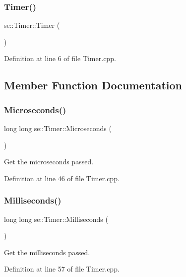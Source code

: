 \subsubsection{\texorpdfstring{Timer()}{Timer()}}
{\footnotesize\ttfamily se\+::\+Timer\+::\+Timer (\begin{DoxyParamCaption}{ }\end{DoxyParamCaption})}



Definition at line 6 of file Timer.\+cpp.



\subsection{Member Function Documentation}
\mbox{\label{classse_1_1_timer_a7fdf38aafc8be894fc25764ff8cabb36}} 
\subsubsection{\texorpdfstring{Microseconds()}{Microseconds()}}
{\footnotesize\ttfamily long long se\+::\+Timer\+::\+Microseconds (\begin{DoxyParamCaption}{ }\end{DoxyParamCaption})}

Get the microseconds passed. 

Definition at line 46 of file Timer.\+cpp.

\mbox{\label{classse_1_1_timer_a9c3fe064b6637f2804c370da786a38d8}} 
\subsubsection{\texorpdfstring{Milliseconds()}{Milliseconds()}}
{\footnotesize\ttfamily long long se\+::\+Timer\+::\+Milliseconds (\begin{DoxyParamCaption}{ }\end{DoxyParamCaption})}

Get the milliseconds passed. 

Definition at line 57 of file Timer.\+cpp.

\mbox{\label{classse_1_1_timer_abde91d5d6e7fe0601c0c9607193707d8}} 
